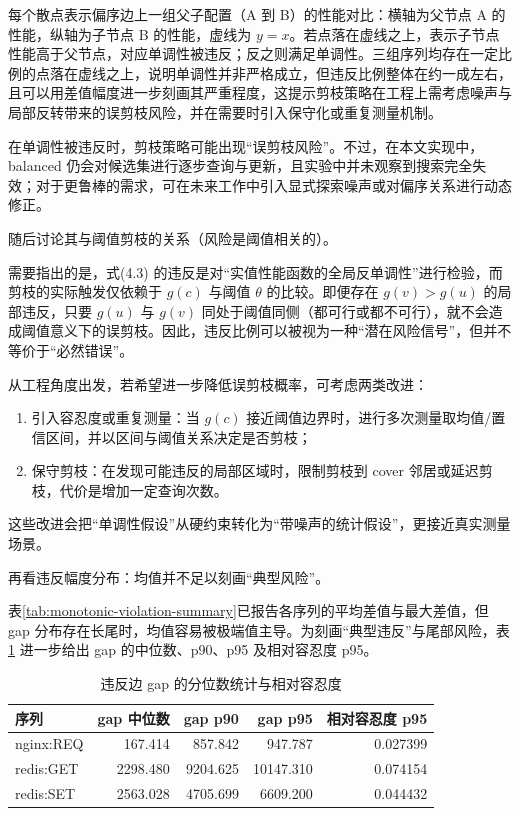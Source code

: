 \documentclass[UTF8,a4paper,12pt,twoside]{ctexart}  %
\begin{document}
每个散点表示偏序边上一组父子配置（A 到
B）的性能对比：横轴为父节点 A 的性能，纵轴为子节点 B 的性能，虚线为
\(y=x\)。若点落在虚线之上，表示子节点性能高于父节点，对应单调性被违反；反之则满足单调性。三组序列均存在一定比例的点落在虚线之上，说明单调性并非严格成立，但违反比例整体在约一成左右，且可以用差值幅度进一步刻画其严重程度，这提示剪枝策略在工程上需考虑噪声与局部反转带来的误剪枝风险，并在需要时引入保守化或重复测量机制。

在单调性被违反时，剪枝策略可能出现``误剪枝风险''。不过，在本文实现中，balanced
仍会对候选集进行逐步查询与更新，且实验中并未观察到搜索完全失效；对于更鲁棒的需求，可在未来工作中引入显式探索噪声或对偏序关系进行动态修正。

随后讨论其与阈值剪枝的关系（风险是阈值相关的）。

需要指出的是，式(4.3)
的违反是对``实值性能函数的全局反单调性''进行检验，而剪枝的实际触发仅依赖于
\(g(c)\) 与阈值 \(\theta\) 的比较。即便存在 \(g(v)>g(u)\)
的局部违反，只要 \(g(u)\) 与 \(g(v)\)
同处于阈值同侧（都可行或都不可行），就不会造成阈值意义下的误剪枝。因此，违反比例可以被视为一种``潜在风险信号''，但并不等价于``必然错误''。

从工程角度出发，若希望进一步降低误剪枝概率，可考虑两类改进：
\begin{enumerate}
\def\labelenumi{\arabic{enumi}.}
\item
  引入容忍度或重复测量：当 \(g(c)\)
  接近阈值边界时，进行多次测量取均值/置信区间，并以区间与阈值关系决定是否剪枝；
\item
  保守剪枝：在发现可能违反的局部区域时，限制剪枝到 cover
  邻居或延迟剪枝，代价是增加一定查询次数。
\end{enumerate}

这些改进会把``单调性假设''从硬约束转化为``带噪声的统计假设''，更接近真实测量场景。

再看违反幅度分布：均值并不足以刻画``典型风险''。

表\ref{tab:monotonic-violation-summary}已报告各序列的平均差值与最大差值，但 gap 分布存在长尾时，均值容易被极端值主导。为刻画``典型违反''与尾部风险，表\ref{tab:gap-quantile-tail} 进一步给出 gap 的中位数、p90、p95 及相对容忍度 p95。

\begin{table}[htbp]
\centering
\small
\setlength{\tabcolsep}{4pt}
\begin{tabular}{lrrrr}
\toprule
序列 & gap 中位数 & gap p90 & gap p95 & 相对容忍度 p95 \\
\midrule
nginx:REQ & 167.414 & 857.842 & 947.787 & 0.027399 \\
redis:GET & 2298.480 & 9204.625 & 10147.310 & 0.074154 \\
redis:SET & 2563.028 & 4705.699 & 6609.200 & 0.044432 \\
\bottomrule
\end{tabular}
\caption{违反边 gap 的分位数统计与相对容忍度}
\label{tab:gap-quantile-tail}
\end{table}
\end{document}
